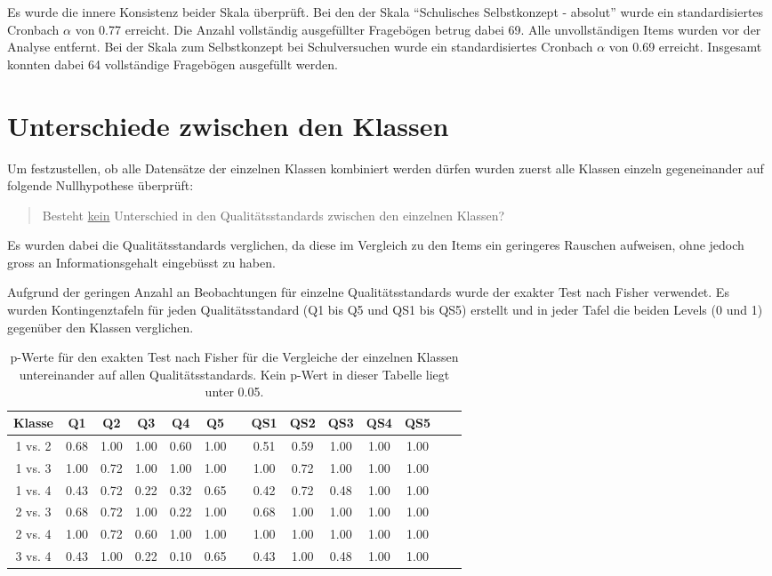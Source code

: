 Es wurde die innere Konsistenz beider Skala überprüft. Bei den der Skala "`Schulisches Selbstkonzept - absolut"' wurde ein standardisiertes Cronbach $\alpha$ von 0.77 erreicht. Die Anzahl vollständig ausgefüllter Fragebögen betrug dabei 69. Alle unvollständigen Items wurden vor der Analyse entfernt. Bei der Skala zum Selbstkonzept bei Schulversuchen wurde ein standardisiertes Cronbach $\alpha$ von 0.69 erreicht. Insgesamt konnten dabei 64 vollständige Fragebögen ausgefüllt werden. 


\section{Unterschiede zwischen den Klassen}

Um festzustellen, ob alle Datensätze der einzelnen Klassen kombiniert werden dürfen wurden zuerst alle Klassen einzeln gegeneinander auf folgende Nullhypothese überprüft: 
\begin{quote}
Besteht \underline{kein} Unterschied in den Qualitätsstandards zwischen den einzelnen Klassen?
\end{quote}
Es wurden dabei die Qualitätsstandards verglichen, da diese im Vergleich zu den Items ein geringeres Rauschen aufweisen, ohne jedoch gross an Informationsgehalt eingebüsst zu haben.


Aufgrund der geringen Anzahl an Beobachtungen für einzelne Qualitätsstandards wurde der exakter Test nach Fisher verwendet. Es wurden Kontingenztafeln für jeden Qualitätsstandard (Q1 bis Q5 und QS1 bis QS5) erstellt und in jeder Tafel die beiden Levels (0 und 1) gegenüber den Klassen verglichen.


\begin{table}[htbp]
  \centering
\begin{tabular}{cccccccccccccc}
\toprule
 Klasse & Q1 & Q2 & Q3 & Q4 & Q5 && QS1 & QS2 & QS3 & QS4 & QS5 \\ 
\midrule
 1 vs. 2 &   0.68 & 1.00 & 1.00 & 0.60 & 1.00 && 0.51 & 0.59 & 1.00 & 1.00 & 1.00   \\ 
 1 vs. 3 &   1.00 & 0.72 & 1.00 & 1.00 & 1.00 && 1.00 & 0.72 & 1.00 & 1.00 & 1.00   \\
 1 vs. 4 &   0.43 & 0.72 & 0.22 & 0.32 & 0.65 && 0.42 & 0.72 & 0.48 & 1.00 & 1.00   \\
 2 vs. 3 &   0.68 & 0.72 & 1.00 & 0.22 & 1.00 && 0.68 & 1.00 & 1.00 & 1.00 & 1.00   \\
 2 vs. 4 &   1.00 & 0.72 & 0.60 & 1.00 & 1.00 && 1.00 & 1.00 & 1.00 & 1.00 & 1.00   \\
 3 vs. 4 &   0.43 & 1.00 & 0.22 & 0.10 & 0.65 && 0.43 & 1.00 & 0.48 & 1.00 & 1.00   \\
\bottomrule
\end{tabular} 
  \caption{p-Werte für den exakten Test nach Fisher für die Vergleiche der einzelnen Klassen untereinander auf allen Qualitätsstandards. Kein p-Wert in dieser Tabelle liegt unter 0.05. }
  \label{tab:KlassenVergleiche}
\end{table}


